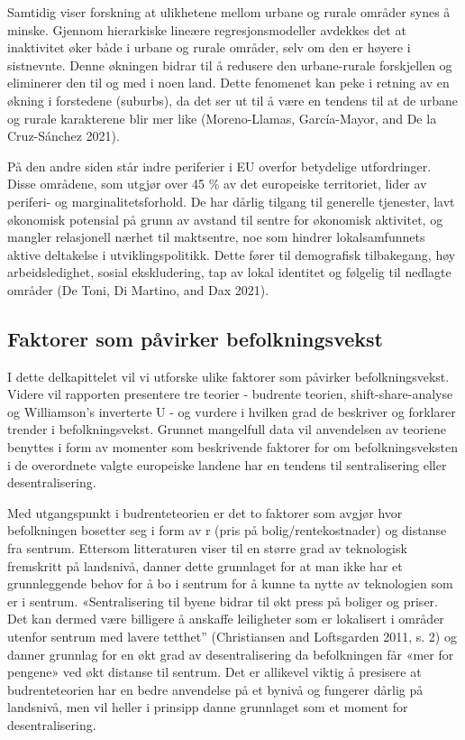 \documentclass[
  letterpaper,
  DIV=11,
  numbers=noendperiod]{scrartcl}
\begin{document}
Samtidig viser forskning at ulikhetene mellom urbane og rurale områder
synes å minske. Gjennom hierarkiske lineære regresjonsmodeller avdekkes
det at inaktivitet øker både i urbane og rurale områder, selv om den er
høyere i sistnevnte. Denne økningen bidrar til å redusere den
urbane-rurale forskjellen og eliminerer den til og med i noen land.
Dette fenomenet kan peke i retning av en økning i forstedene (suburbs),
da det ser ut til å være en tendens til at de urbane og rurale
karakterene blir mer like (Moreno-Llamas, García-Mayor, and De la
Cruz-Sánchez 2021).

På den andre siden står indre periferier i EU overfor betydelige
utfordringer. Disse områdene, som utgjør over 45 \% av det europeiske
territoriet, lider av periferi- og marginalitetsforhold. De har dårlig
tilgang til generelle tjenester, lavt økonomisk potensial på grunn av
avstand til sentre for økonomisk aktivitet, og mangler relasjonell
nærhet til maktsentre, noe som hindrer lokalsamfunnets aktive deltakelse
i utviklingspolitikk. Dette fører til demografisk tilbakegang, høy
arbeidsledighet, sosial ekskludering, tap av lokal identitet og følgelig
til nedlagte områder (De Toni, Di Martino, and Dax 2021).

\hypertarget{faktorer-som-puxe5virker-befolkningsvekst}{%
\subsection{\texorpdfstring{\textbf{Faktorer som påvirker
befolkningsvekst}}{Faktorer som påvirker befolkningsvekst}}\label{faktorer-som-puxe5virker-befolkningsvekst}}

I dette delkapittelet vil vi utforske ulike faktorer som påvirker
befolkningsvekst. Videre vil rapporten presentere tre teorier - budrente
teorien, shift-share-analyse og Williamson's inverterte U - og vurdere i
hvilken grad de beskriver og forklarer trender i befolkningsvekst.
Grunnet mangelfull data vil anvendelsen av teoriene benyttes i form av
momenter som beskrivende faktorer for om befolkningsveksten i de
overordnete valgte europeiske landene har en tendens til sentralisering
eller desentralisering.

Med utgangspunkt i budrenteteorien er det to faktorer som avgjør hvor
befolkningen bosetter seg i form av r (pris på bolig/rentekostnader) og
distanse fra sentrum. Ettersom litteraturen viser til en større grad av
teknologisk fremskritt på landsnivå, danner dette grunnlaget for at man
ikke har et grunnleggende behov for å bo i sentrum for å kunne ta nytte
av teknologien som er i sentrum. «Sentralisering til byene bidrar til
økt press på boliger og priser. Det kan dermed være billigere å anskaffe
leiligheter som er lokalisert i områder utenfor sentrum med lavere
tetthet'' (Christiansen and Loftsgarden 2011, s. 2) og danner grunnlag
for en økt grad av desentralisering da befolkningen får «mer for
pengene» ved økt distanse til sentrum. Det er allikevel viktig å
presisere at budrenteteorien har en bedre anvendelse på et bynivå og
fungerer dårlig på landsnivå, men vil heller i prinsipp danne grunnlaget
som et moment for desentralisering.
\end{document}
